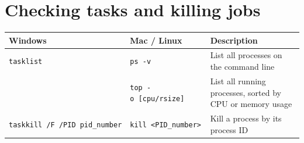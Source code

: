 \documentclass[]{book}
\begin{document}
\section{Checking tasks and killing
jobs}\label{checking-tasks-and-killing-jobs}

\begin{longtable}[]{@{}lll@{}}
\toprule
\begin{minipage}[b]{0.13\columnwidth}\raggedright\strut
Windows\strut
\end{minipage} & \begin{minipage}[b]{0.18\columnwidth}\raggedright\strut
Mac / Linux\strut
\end{minipage} & \begin{minipage}[b]{0.18\columnwidth}\raggedright\strut
Description\strut
\end{minipage}\tabularnewline
\midrule
\endhead
\begin{minipage}[t]{0.13\columnwidth}\raggedright\strut
\texttt{tasklist}\strut
\end{minipage} & \begin{minipage}[t]{0.18\columnwidth}\raggedright\strut
\texttt{ps\ -v}\strut
\end{minipage} & \begin{minipage}[t]{0.18\columnwidth}\raggedright\strut
List all processes on the command line\strut
\end{minipage}\tabularnewline
\begin{minipage}[t]{0.13\columnwidth}\raggedright\strut
\strut
\end{minipage} & \begin{minipage}[t]{0.18\columnwidth}\raggedright\strut
\texttt{top\ -o\ {[}cpu/rsize{]}}\strut
\end{minipage} & \begin{minipage}[t]{0.18\columnwidth}\raggedright\strut
List all running processes, sorted by CPU or memory usage\strut
\end{minipage}\tabularnewline
\begin{minipage}[t]{0.13\columnwidth}\raggedright\strut
\texttt{taskkill\ /F\ /PID\ pid\_number}\strut
\end{minipage} & \begin{minipage}[t]{0.18\columnwidth}\raggedright\strut
\texttt{kill\ \textless{}PID\_number\textgreater{}}\strut
\end{minipage} & \begin{minipage}[t]{0.18\columnwidth}\raggedright\strut
Kill a process by its process ID\strut
\end{minipage}\tabularnewline

\end{longtable}
\end{document}
